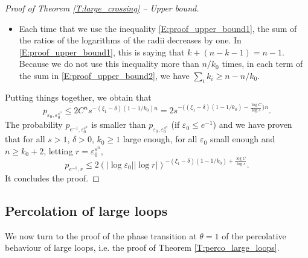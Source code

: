 \documentclass[11pt]{article}
\theoremstyle{remark}
\newcommand{\eps}{\varepsilon}
\numberwithin{equation}{section}
\begin{document}
\begin{proof}[Proof of Theorem \ref{T:large_crossing} -- Upper bound]
\begin{itemize}
\item
Each time that we use the inequality \eqref{E:proof_upper_bound1}, the sum of the ratios of the logarithms of the radii decreases by one. In \eqref{E:proof_upper_bound1}, this is saying that $k + (n-k-1) = n-1$. Because we do not use this inequality more than $n/k_0$ times, in each term of the sum in \eqref{E:proof_upper_bound2}, we have $\sum_i k_i \geq n - n/k_0$.
\end{itemize}
Putting things together, we obtain that
\[
p_{\eps_0, \eps_0^{s^n}} \leq 2 C^n s^{-({\xi_1} - \delta)(1-1/k_0) n} = 2 s^{-\{({\xi_1} - \delta)(1-1/k_0) - \frac{\log C}{\log s} \} n}.
\]
The probability $p_{e^{-1}, \eps_0^{s^n}}$ is smaller than $p_{\eps_0, \eps_0^{s^n}}$ (if $\eps_0 \leq e^{-1}$) and we have proven that for all $s>1$, $\delta >0$, $k_0 \geq 1$ large enough, for all $\eps_0$ small enough and $n \geq k_0+2$, letting $r = \eps_0^{s^n}$,
\[
p_{e^{-1}, r} \leq 2 \left( |\log \eps_0| |\log r| \right)^{-({\xi_1} - \delta)(1-1/k_0) + \frac{\log C}{\log s} }.
\]
It concludes the proof.
\end{proof}


\subsection{Percolation of large loops}

We now turn to the proof of the phase transition at $\theta = 1$ of the percolative behaviour of large loops, i.e. the proof of Theorem \ref{T:perco_large_loops}.
\end{document}
